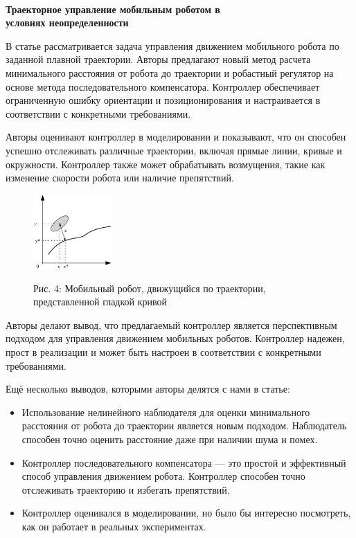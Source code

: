 \documentclass[russian,11pt]{article}
\providecommand{\header}[1]{
\,
\begin{center}
{\Large \textbf{#1}}
\end{center}
}
\begin{document}
\pagebreak \header{Траекторное управление мобильным роботом в\\условиях неопределенности \cite{3}}

В статье рассматривается задача управления движением мобильного робота по заданной плавной траектории. Авторы предлагают новый метод расчета минимального расстояния от робота до траектории и робастный регулятор на основе метода последовательного компенсатора. Контроллер обеспечивает ограниченную ошибку ориентации и позиционирования и настраивается в соответствии с конкретными требованиями.

Авторы оценивают контроллер в моделировании и показывают, что он способен успешно отслеживать различные траектории, включая прямые линии, кривые и окружности. Контроллер также может обрабатывать возмущения, такие как изменение скорости робота или наличие препятствий.

\begin{figure}[!h]
\centering
\includegraphics[width=0.27\textwidth]{3_robot}
\begin{center}{\footnotesize Рис. 4: Мобильный робот, движущийся по траектории,\\ представленной гладкой кривой}\end{center}
\end{figure}

Авторы делают вывод, что предлагаемый контроллер является перспективным подходом для управления движением мобильных роботов. Контроллер надежен, прост в реализации и может быть настроен в соответствии с конкретными требованиями.

Ещё несколько выводов, которыми авторы делятся с нами в статье:
\begin{itemize}
\item Использование нелинейного наблюдателя для оценки минимального расстояния от робота до траектории является новым подходом. Наблюдатель способен точно оценить расстояние даже при наличии шума и помех.
\item Контроллер последовательного компенсатора — это простой и эффективный способ управления движением робота. Контроллер способен точно отслеживать траекторию и избегать препятствий.
\item Контроллер оценивался в моделировании, но было бы интересно посмотреть, как он работает в реальных экспериментах.
\end{itemize}
\end{document}
